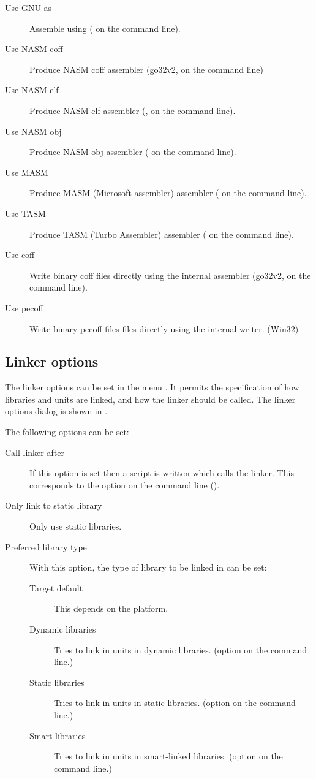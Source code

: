 \begin{description}
\begin{description}
\item[Use GNU as] Assemble using \gnu {} ( on the
command line).
\item[Use NASM coff] Produce NASM coff assembler (go32v2,  on the
command line)
\item[Use NASM elf] Produce NASM elf assembler (\linux,  on
the command line).
\item[Use NASM obj] Produce NASM obj assembler ( on the
command line).
\item[Use MASM] Produce MASM (Microsoft assembler) assembler ( on the
command line).
\item[Use TASM] Produce TASM (Turbo Assembler) assembler ( on the
command line).
\item[Use coff] Write binary coff files directly using the internal
assembler (go32v2,  on the command line).
\item[Use pecoff] Write binary pecoff files files directly using the
internal writer. (Win32)
\end{description}
\end{description}
%
%
\subsection{Linker options}
The linker options can be set in the menu . 
It permits the specification of how libraries and units are linked, 
and how the linker should be called.
The linker options dialog is shown in .


The following options can be set:
\begin{description}
\item[Call linker after] If this option is set then a script is written
which calls the linker. This corresponds to the  option on the
command line ().
\item[Only link to static library] Only use static libraries.

\item[Preferred library type] With this option, the type of library to be
linked in can be set:
\begin{description}
\item[Target default] This depends on the platform.
\item[Dynamic libraries] Tries to link in units in dynamic libraries.
(option  on the command line.)
\item[Static libraries] Tries to link in units in static libraries.
(option  on the command line.)
\item[Smart libraries] Tries to link in units in smart-linked libraries.
(option  on the command line.)
\end{description}
\end{description}
%
%
